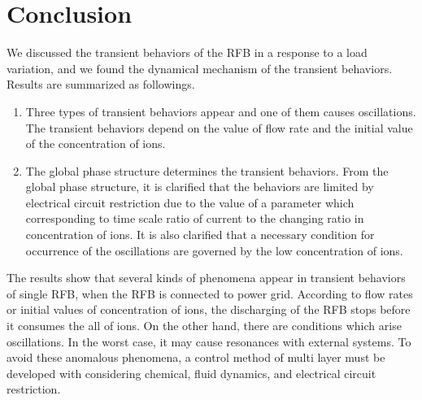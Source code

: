 \documentclass[a4paper]{article}
\begin{document}
\section{Conclusion}
We discussed the transient behaviors of the RFB in a response to a load variation, 
and we found the dynamical mechanism of the transient behaviors. 
Results are summarized as followings. 
\begin{enumerate}
 \item Three types of transient behaviors appear and one of them causes oscillations.
       The transient behaviors depend on the value of flow rate and the initial value of the concentration of ions. 
 \item The global phase structure determines the transient behaviors.
       From the global phase structure, it is clarified that the behaviors are limited by electrical circuit restriction
       due to the value of a parameter which corresponding to time scale ratio of current to the changing ratio in concentration of ions. 
       It is also clarified that a necessary condition for occurrence of the oscillations are governed by the low concentration of ions. 
\end{enumerate}

The results show that
several kinds of phenomena appear in transient behaviors of single RFB, 
when the RFB is connected to power grid. 
According to flow rates or initial values of concentration of ions, 
the discharging of the RFB stops before it consumes the all of ions. 
On the other hand, there are conditions which arise oscillations. 
In the worst case, it may cause resonances with external systems. 
To avoid these anomalous phenomena, 
a control method of multi layer must be developed with considering chemical, fluid dynamics,
and electrical circuit restriction. 
\end{document}
